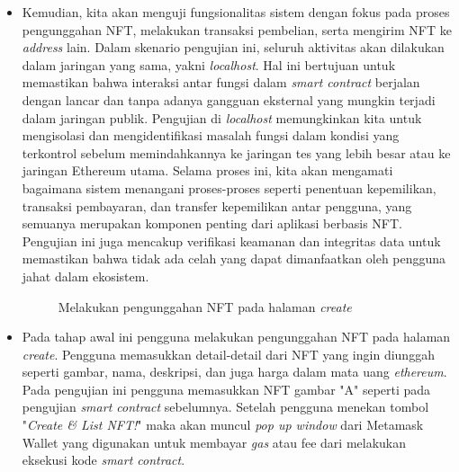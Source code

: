 \begin{itemize}
        \item Kemudian, kita akan menguji fungsionalitas sistem dengan fokus pada proses pengunggahan NFT, melakukan transaksi pembelian, serta mengirim NFT ke \emph{address} lain. Dalam skenario pengujian ini, seluruh aktivitas akan dilakukan dalam jaringan yang sama, yakni \emph{localhost}. Hal ini bertujuan untuk memastikan bahwa interaksi antar fungsi dalam \emph{smart contract} berjalan dengan lancar dan tanpa adanya gangguan eksternal yang mungkin terjadi dalam jaringan publik. Pengujian di \emph{localhost} memungkinkan kita untuk mengisolasi dan mengidentifikasi masalah fungsi dalam kondisi yang terkontrol sebelum memindahkannya ke jaringan tes yang lebih besar atau ke jaringan Ethereum utama. Selama proses ini, kita akan mengamati bagaimana sistem menangani proses-proses seperti penentuan kepemilikan, transaksi pembayaran, dan transfer kepemilikan antar pengguna, yang semuanya merupakan komponen penting dari aplikasi berbasis NFT. Pengujian ini juga mencakup verifikasi keamanan dan integritas data untuk memastikan bahwa tidak ada celah yang dapat dimanfaatkan oleh pengguna jahat dalam ekosistem.
      
      \begin{figure} [H] \centering
        \caption{Melakukan pengunggahan NFT pada halaman \emph{create}}
        \label{fig:createnft}
        \end{figure}

      \item Pada tahap awal ini pengguna melakukan pengunggahan NFT pada halaman \emph{create}. Pengguna memasukkan detail-detail dari NFT yang ingin diunggah seperti gambar, nama, deskripsi, dan juga harga dalam mata uang \emph{ethereum}. Pada pengujian ini pengguna memasukkan NFT gambar "A" seperti pada pengujian \emph{smart contract} sebelumnya. Setelah pengguna menekan tombol "\emph{Create \& List NFT!}" maka akan muncul \emph{pop up window} dari Metamask Wallet yang digunakan untuk membayar \emph{gas} atau fee dari melakukan eksekusi kode \emph{smart contract}. 
      

\end{itemize}
